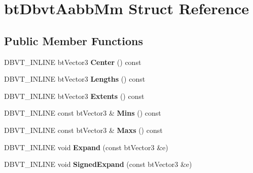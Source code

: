 \hypertarget{structbt_dbvt_aabb_mm}{\section{bt\+Dbvt\+Aabb\+Mm Struct Reference}
\label{structbt_dbvt_aabb_mm}
}
\subsection*{Public Member Functions}
\begin{DoxyCompactItemize}
\item 
\hypertarget{structbt_dbvt_aabb_mm_a091869fdf8a9a64f2da6d968c7daace1}{D\+B\+V\+T\+\_\+\+I\+N\+L\+I\+N\+E bt\+Vector3 {\bfseries Center} () const }\label{structbt_dbvt_aabb_mm_a091869fdf8a9a64f2da6d968c7daace1}

\item 
\hypertarget{structbt_dbvt_aabb_mm_ae32f095efbe9fb7248fb97715276606d}{D\+B\+V\+T\+\_\+\+I\+N\+L\+I\+N\+E bt\+Vector3 {\bfseries Lengths} () const }\label{structbt_dbvt_aabb_mm_ae32f095efbe9fb7248fb97715276606d}

\item 
\hypertarget{structbt_dbvt_aabb_mm_a506461ff47c79811857c33b52ec3b2a3}{D\+B\+V\+T\+\_\+\+I\+N\+L\+I\+N\+E bt\+Vector3 {\bfseries Extents} () const }\label{structbt_dbvt_aabb_mm_a506461ff47c79811857c33b52ec3b2a3}

\item 
\hypertarget{structbt_dbvt_aabb_mm_a38dff65559e91f07ef9d5eb4b329a8f9}{D\+B\+V\+T\+\_\+\+I\+N\+L\+I\+N\+E const bt\+Vector3 \& {\bfseries Mins} () const }\label{structbt_dbvt_aabb_mm_a38dff65559e91f07ef9d5eb4b329a8f9}

\item 
\hypertarget{structbt_dbvt_aabb_mm_a4d15a5323acdaad28afecdf1b6daaa10}{D\+B\+V\+T\+\_\+\+I\+N\+L\+I\+N\+E const bt\+Vector3 \& {\bfseries Maxs} () const }\label{structbt_dbvt_aabb_mm_a4d15a5323acdaad28afecdf1b6daaa10}

\item 
\hypertarget{structbt_dbvt_aabb_mm_a93bf0a81247ad642fdc6b0213b0ed68b}{D\+B\+V\+T\+\_\+\+I\+N\+L\+I\+N\+E void {\bfseries Expand} (const bt\+Vector3 \&e)}\label{structbt_dbvt_aabb_mm_a93bf0a81247ad642fdc6b0213b0ed68b}

\item 
\hypertarget{structbt_dbvt_aabb_mm_a182dddf6be4856c35c89057ff8a2d3ee}{D\+B\+V\+T\+\_\+\+I\+N\+L\+I\+N\+E void {\bfseries Signed\+Expand} (const bt\+Vector3 \&e)}\label{structbt_dbvt_aabb_mm_a182dddf6be4856c35c89057ff8a2d3ee}


\end{DoxyCompactItemize}
